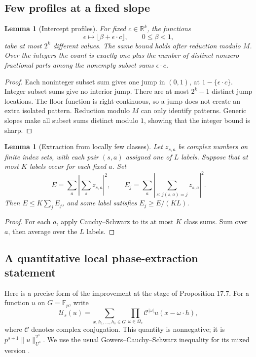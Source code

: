 \documentclass[11pt,letterpaper]{article}
\numberwithin{equation}{section}
\newtheorem{lemma}[theorem]{Lemma}
\theoremstyle{definition}
\theoremstyle{remark}
\newcommand{\1}{\mathbf 1}
\begin{document}
\subsection{Few profiles at a fixed slope}

\begin{lemma}[Intercept profiles]\label{gsr:fp:04:pat:fixed-slope}
For fixed $c\in\mathbb R^k$, the functions
\[
 \epsilon\longmapsto\lfloor\beta+\epsilon\cdot c\rfloor,
 \qquad 0\le\beta<1,
\]
take at most $2^k$ different values. The same bound holds after reduction
modulo $M$. Over the integers the count is exactly one plus the number
of distinct nonzero fractional parts among the nonempty subset sums
$\epsilon\cdot c$.
\end{lemma}
\begin{proof}
Each noninteger subset sum gives one jump in $(0,1)$, at
$1-\{\epsilon\cdot c\}$. Integer subset sums give no interior jump.
There are at most $2^k-1$ distinct jump locations. The floor function is
right-continuous, so a jump does not create an extra isolated pattern.
Reduction modulo $M$ can only identify patterns. Generic slopes make all
subset sums distinct modulo $1$, showing that the integer bound is sharp.
\end{proof}

\begin{lemma}[Extraction from locally few classes]\label{gsr:fp:04:pat:sparse}
Let $z_{s,a}$ be complex numbers on finite index sets, with each pair
$(s,a)$ assigned one of $L$ labels. Suppose that at most $K$ labels occur
for each fixed $a$. Set
\[
 E=\sum_a\left|\sum_s z_{s,a}\right|^2,
 \qquad
 E_j=\sum_a\left|\sum_{s:\,j(s,a)=j}z_{s,a}\right|^2.
\]
Then $E\le K\sum_jE_j$, and some label satisfies $E_j\ge E/(KL)$.
\end{lemma}
\begin{proof}
For each $a$, apply Cauchy--Schwarz to its at most $K$ class sums.
Sum over $a$, then average over the $L$ labels.
\end{proof}

\subsection{A quantitative local phase-extraction statement}

Here is a precise form of the improvement at the stage of Proposition
17.7. For a function $u$ on $G=\mathbb F_p$, write
\[
 \mathcal U_s(u)=
 \sum_{x,h_1,\ldots,h_s\in G}
 \prod_{\omega\in\Omega_s}
 \mathcal C^{|\omega|}u(x-\omega\cdot h),
\]
where $\mathcal C$ denotes complex conjugation. This quantity is
nonnegative; it is $p^{s+1}\|u\|_{U^s}^{2^s}$. We use the usual
Gowers--Cauchy--Schwarz inequality for its mixed version
\cite[Lemma 3.8]{gowers}.
\end{document}
